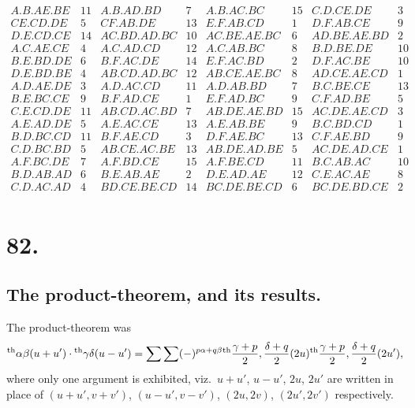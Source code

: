 \documentclass[11pt,a4paper]{book}
\providecommand{\uth}{\textsuperscript{th}}
\begin{document}
\[
\begin{array}{llllllllllllll}
A.B.AE.BE & 11 & A.B.AD.BD & 7 & A.B.AC.BC & 15 & C.D.CE.DE & 3 \\
CE.CD.DE & 5 & CF.AB.DE & 13 & E.F.AB.CD & 1 & D.F.AB.CE & 9 \\
D.E.CD.CE & 14 & AC.BD.AD.BC & 10 & AC.BE.AE.BC & 6 & AD.BE.AE.BD & 2 \\
A.C.AE.CE & 4 & A.C.AD.CD & 12 & A.C.AB.BC & 8 & B.D.BE.DE & 10 \\
B.E.BD.DE & 6 & B.F.AC.DE & 14 & E.F.AC.BD & 2 & D.F.AC.BE & 10 \\
D.E.BD.BE & 4 & AB.CD.AD.BC & 12 & AB.CE.AE.BC & 8 & AD.CE.AE.CD & 1 \\
A.D.AE.DE & 3 & A.D.AC.CD & 11 & A.D.AB.BD & 7 & B.C.BE.CE & 13 \\
B.E.BC.CE & 9 & B.F.AD.CE & 1 & E.F.AD.BC & 9 & C.F.AD.BE & 5 \\
C.E.CD.DE & 11 & AB.CD.AC.BD & 7 & AB.DE.AE.BD & 15 & AC.DE.AE.CD & 3 \\
A.E.AD.DE & 5 & A.E.AC.CE & 13 & A.E.AB.BE & 9 & B.C.BD.CD & 1 \\
B.D.BC.CD & 11 & B.F.AE.CD & 3 & D.F.AE.BC & 13 & C.F.AE.BD & 9 \\
C.D.BC.BD & 5 & AB.CE.AC.BE & 13 & AB.DE.AD.BE & 5 & AC.DE.AD.CE & 1 \\
A.F.BC.DE & 7 & A.F.BD.CE & 15 & A.F.BE.CD & 11 & B.C.AB.AC & 10 \\
B.D.AB.AD & 6 & B.E.AB.AE & 2 & D.E.AD.AE & 12 & C.E.AC.AE & 8 \\
C.D.AC.AD & 4 & BD.CE.BE.CD & 14 & BC.DE.BE.CD & 6 & BC.DE.BD.CE & 2 \\
& & & & & & & & & & & & &
\end{array}
\]

\newpage
\section*{82.}
\label{sec:82}

\subsection*{The product-theorem, and its results.}

The product-theorem was
\[
\uth{\alpha\beta}(u+u') \cdot \uth{\gamma\delta}(u-u')
= \sum \sum (-)^{p\alpha + q\beta}
\uth{\frac{\gamma+p}{2}, \frac{\delta+q}{2}}(2u)
\uth{\frac{\gamma+p}{2}, \frac{\delta+q}{2}}(2u'),
\]
where only one argument is exhibited, viz.\ $u+u'$, $u-u'$, $2u$, $2u'$ are written in place of $(u+u', v+v')$, $(u-u', v-v')$, $(2u, 2v)$, $(2u', 2v')$ respectively.
\end{document}
